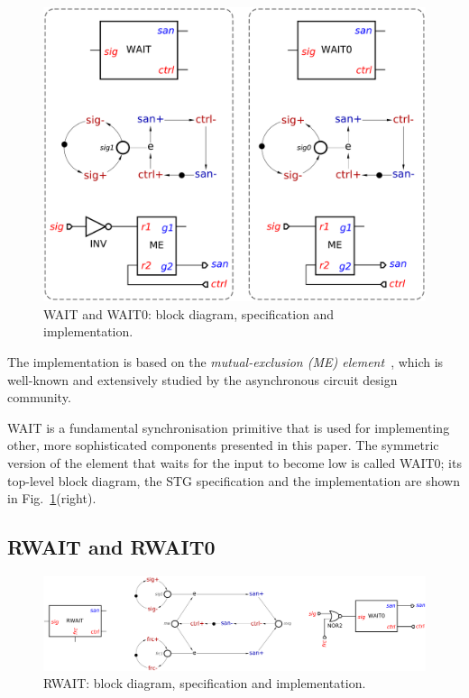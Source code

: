 \documentclass[conference]{IEEEtran}
\begin{document}
\begin{figure}
\begin{center}
    \includegraphics[scale=0.23]{fig/WAIT.pdf}
    \caption{\textsf{WAIT} and \textsf{WAIT0}: block diagram,
    specification and implementation.}
    \label{fig:wait}
\end{center}
\end{figure}

The implementation is based on the \emph{mutual-exclusion (ME)
element}~\cite{2008_kinniment_synchronisation}, which is well-known and extensively
studied by the asynchronous circuit design community.

\textsf{WAIT} is a fundamental synchronisation primitive that is used for
implementing other, more sophisticated components presented in this paper.
The symmetric version of the element that waits for the input to become low is
called \textsf{WAIT0}; its top-level block diagram, the STG specification and
the implementation are shown in Fig.~\ref{fig:wait}(right).

\subsection{\textsf{RWAIT} and \textsf{RWAIT0}}

\begin{figure}
\begin{center}
    \includegraphics[scale=0.23]{fig/RWAIT.pdf}
    \caption{\textsf{RWAIT}: block diagram, specification and implementation.}
    \label{fig:rwait}
\end{center}
\end{figure}
\end{document}
